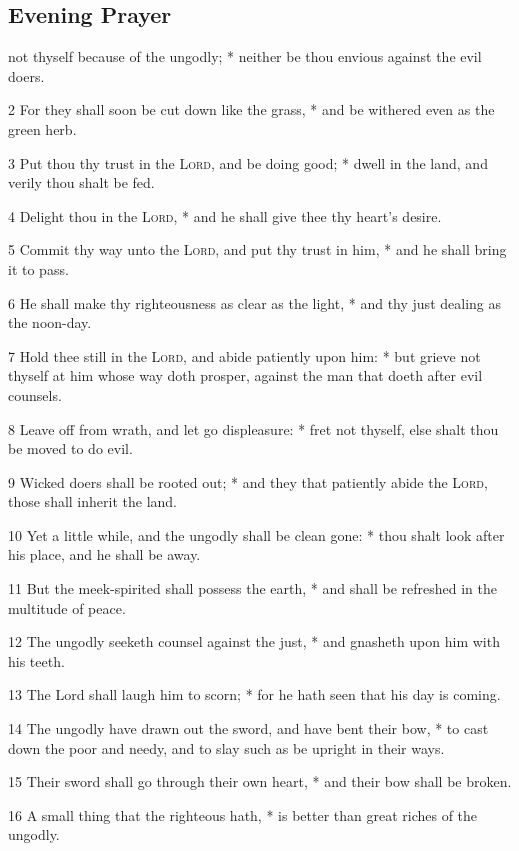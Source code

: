 \subsection{Evening Prayer}
 not thyself because of the ungodly; * neither be thou envious against the evil doers.\par
2 For they shall soon be cut down like the grass, * and be withered even as the green herb.\par
3 Put thou thy trust in the {\textsc{Lord}}, and be doing good; * dwell in the land, and verily thou shalt be fed.\par
4 Delight thou in the {\textsc{Lord}}, * and he shall give thee thy heart's desire.\par
5 Commit thy way unto the {\textsc{Lord}}, and put thy trust in him, * and he shall bring it to pass.\par
6 He shall make thy righteousness as clear as the light, * and thy just dealing as the noon-day.\par
7 Hold thee still in the {\textsc{Lord}}, and abide patiently upon him: * but grieve not thyself at him whose way doth prosper, against the man that doeth after evil counsels.\par
8 Leave off from wrath, and let go displeasure: * fret not thyself, else shalt thou be moved to do evil.\par
9 Wicked doers shall be rooted out; * and they that patiently abide the {\textsc{Lord}}, those shall inherit the land.\par
10 Yet a little while, and the ungodly shall be clean gone: * thou shalt look after his place, and he shall be away.\par
11 But the meek-spirited shall possess the earth, * and shall be refreshed in the multitude of peace.\par
12 The ungodly seeketh counsel against the just, * and gnasheth upon him with his teeth.\par
13 The Lord shall laugh him to scorn; * for he hath seen that his day is coming.\par
14 The ungodly have drawn out the sword, and have bent their bow, * to cast down the poor and needy, and to slay such as be upright in their ways.\par
15 Their sword shall go through their own heart, * and their bow shall be broken.\par
16 A small thing that the righteous hath, * is better than great riches of the ungodly.\par
